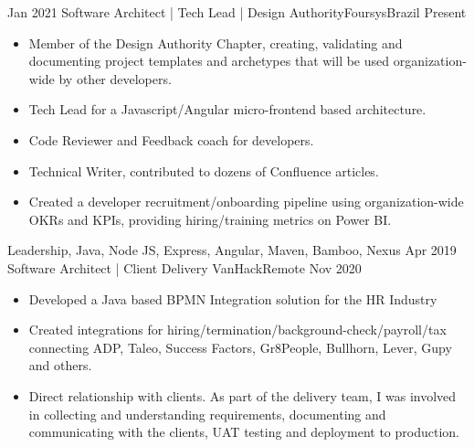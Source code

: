 %
%
%
\begin{experiences}
  \experience
    {Jan 2021}   {Software Architect | Tech Lead | Design Authority}{Foursys}{Brazil}
    {Present} {
                      \begin{itemize}
                        \item Member of the Design Authority Chapter, creating, validating and documenting project templates and archetypes that will be used organization-wide by other developers.
                        \item Tech Lead for a Javascript/Angular micro-frontend based architecture.
                        \item Code Reviewer and Feedback coach for developers.
                        \item Technical Writer, contributed to dozens of Confluence articles.
                        \item Created a developer recruitment/onboarding pipeline using organization-wide OKRs and KPIs, providing hiring/training metrics on Power BI.                          
                      \end{itemize}
                    }
                    {Leadership, Java, Node JS, Express, Angular, Maven, Bamboo, Nexus}
  \emptySeparator
  \experience
    {Apr 2019} {Software Architect | Client Delivery }{VanHack}{Remote}
    {Nov 2020}    {
                      \begin{itemize}
                        \item Developed a Java based BPMN Integration solution for the HR Industry         
                        \item Created integrations for hiring/termination/background-check/payroll/tax connecting ADP, Taleo, Success Factors, Gr8People, Bullhorn, Lever, Gupy and others.
                        \item Direct relationship with clients. As part of the delivery team, I was involved in collecting and understanding requirements, documenting and communicating with the clients, UAT testing and deployment to production.          
                      \end{itemize}
}
\end{experiences}
